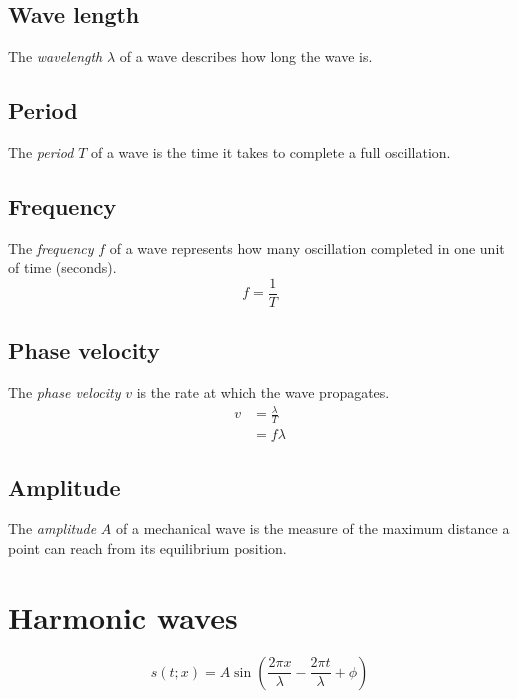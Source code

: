 \documentclass{article}
\begin{document}
\subsection{Wave length}

The \textit{wavelength} \(\lambda\) of a wave describes how long the wave is.

\subsection{Period}

The \textit{period} \(T\) of a wave is the time it takes to complete
a full oscillation.

\subsection{Frequency}

The \textit{frequency} \(f\) of a wave represents how many oscillation
completed in one unit of time (seconds).
\[
    f = \frac{1}{T}
\]

\subsection{Phase velocity}

The \textit{phase velocity} \(v\) is the rate at which
the wave propagates.
\begin{align*}
    v &= \frac{\lambda}{T} \\
    &= f\lambda
\end{align*}

\subsection{Amplitude}

The \textit{amplitude} \(A\) of a mechanical wave is the
measure of the maximum distance a point can reach
from its equilibrium position.

\pagebreak

\section{Harmonic waves}

\[
    s(t;x) = A \sin
    \left(
        \frac{2\pi x}{\lambda} - \frac{2\pi t}{\lambda}+\phi
    \right)
\]
\end{document}
